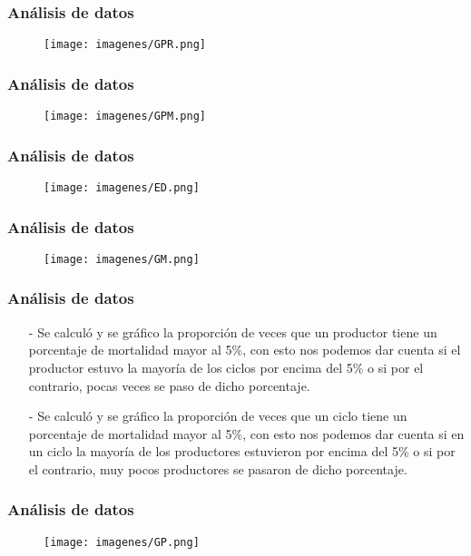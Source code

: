 \documentclass[11pt]{beamer}
\begin{document}
\begin{frame}
\frametitle{Análisis de datos}
\begin{figure}[!h]
        \texttt{[image: imagenes/GPR.png]}
        \label{figura1}
\end{figure}
\end{frame}

\begin{frame}
\frametitle{Análisis de datos}
\begin{figure}[!h]
        \texttt{[image: imagenes/GPM.png]}
        \label{figura1}
\end{figure}
\end{frame}

\begin{frame}
\frametitle{Análisis de datos}
\begin{figure}[!h]
        \texttt{[image: imagenes/ED.png]}
        \label{figura1}
\end{figure}
\end{frame}

\begin{frame}
\frametitle{Análisis de datos}
\begin{figure}[!h]
        \texttt{[image: imagenes/GM.png]}
        \label{figura1}
\end{figure}
\end{frame}

\begin{frame}
\frametitle{Análisis de datos}
\begin{itemize}
\justifying
\item[-]Se calculó y se gráfico la proporción de veces que un productor tiene un porcentaje de mortalidad mayor al 5\%, con esto nos podemos dar cuenta si el productor estuvo la mayoría de los ciclos por encima del 5\% o si por el contrario, pocas veces se paso de dicho porcentaje.
\item[-]Se calculó y se gráfico la proporción de veces que un ciclo tiene un porcentaje de mortalidad mayor al 5\%, con esto nos podemos dar cuenta si en un ciclo la mayoría de los productores estuvieron por encima del 5\% o si por el contrario, muy pocos productores se pasaron de dicho porcentaje.
\end{itemize}
\end{frame}

\begin{frame}
\frametitle{Análisis de datos}
\begin{figure}[!h]
        \texttt{[image: imagenes/GP.png]}
        \label{figura1}
\end{figure}
\end{frame}
\end{document}
